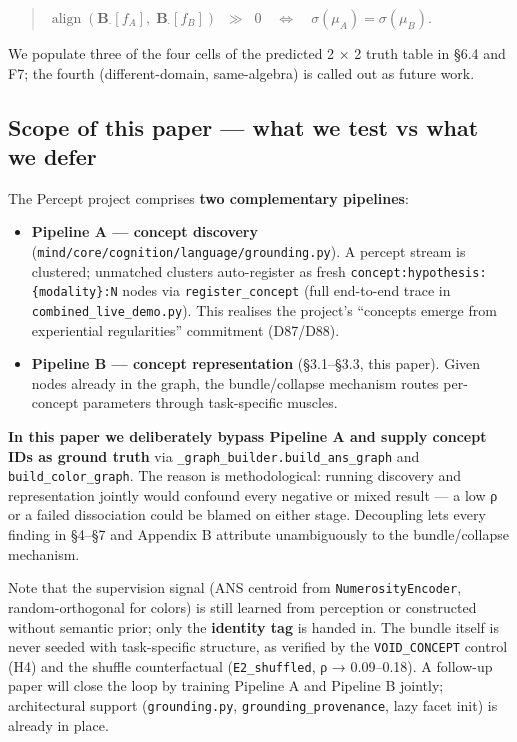 \begin{quote}
\(\operatorname{align}(\mathbf{B}_{\cdot}[f_A],\;\mathbf{B}_{\cdot}[f_B]) \;\;\gg\;\; 0 \quad \Longleftrightarrow \quad \sigma(\mu_A) = \sigma(\mu_B).\)
\end{quote}

We populate three of the four cells of the predicted 2 × 2 truth
table in §6.4 and F7; the fourth (different-domain, same-algebra)
is called out as future work.

\subsection{Scope of this paper --- what we test vs what we defer}

The Percept project comprises \textbf{two complementary pipelines}:

\begin{itemize}
\tightlist
\item
  \textbf{Pipeline A --- concept discovery}
  (\texttt{mind/core/cognition/language/grounding.py}). A percept stream is
  clustered; unmatched clusters auto-register as fresh
  \texttt{concept:hypothesis:\{modality\}:N} nodes via \texttt{register\_concept}
  (full end-to-end trace in \texttt{combined\_live\_demo.py}). This realises
  the project's ``concepts emerge from experiential regularities''
  commitment (D87/D88).
\item
  \textbf{Pipeline B --- concept representation} (§3.1--§3.3, this paper).
  Given nodes already in the graph, the bundle/collapse mechanism
  routes per-concept parameters through task-specific muscles.
\end{itemize}

\textbf{In this paper we deliberately bypass Pipeline A and supply concept
IDs as ground truth} via \texttt{\_graph\_builder.build\_ans\_graph} and
\texttt{build\_color\_graph}. The reason is methodological: running discovery
and representation jointly would confound every negative or mixed
result --- a low ρ or a failed dissociation could be blamed on either
stage. Decoupling lets every finding in §4--§7 and Appendix B
attribute unambiguously to the bundle/collapse mechanism.

Note that the supervision signal (ANS centroid from
\texttt{NumerosityEncoder}, random-orthogonal for colors) is still learned
from perception or constructed without semantic prior; only the
\textbf{identity tag} is handed in. The bundle itself is never seeded
with task-specific structure, as verified by the \texttt{VOID\_CONCEPT}
control (H4) and the shuffle counterfactual
(\texttt{E2\_shuffled}, \textbar ρ\textbar{} → 0.09--0.18). A follow-up paper will close the
loop by training Pipeline A and Pipeline B jointly; architectural
support (\texttt{grounding.py}, \texttt{grounding\_provenance}, lazy facet
init) is already in place.

